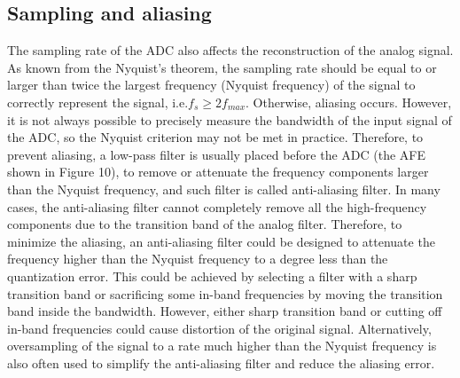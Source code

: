 \subsection{Sampling and aliasing}
The sampling rate of the ADC also affects the reconstruction of the analog signal. As known from the Nyquist’s theorem, the sampling rate should be equal to or larger than twice the largest frequency (Nyquist frequency) of the signal to correctly represent the signal, i.e.$ f_s \geqslant 2f_{max}$. Otherwise, aliasing occurs. However, it is not always possible to precisely measure the bandwidth of the input signal of the ADC, so the Nyquist criterion may not be met in practice. Therefore, to prevent aliasing, a low-pass filter is usually placed before the ADC (the AFE shown in Figure 10), to remove or attenuate the frequency components larger than the Nyquist frequency, and such filter is called anti-aliasing filter. In many cases, the anti-aliasing filter cannot completely remove all the high-frequency components due to the transition band of the analog filter. Therefore, to minimize the aliasing, an anti-aliasing filter could be designed to attenuate the frequency higher than the Nyquist frequency to a degree less than the quantization error\citep{mitra2006digital}. This could be achieved by selecting a filter with a sharp transition band or sacrificing some in-band frequencies by moving the transition band inside the bandwidth. However, either sharp transition band or cutting off in-band frequencies could cause distortion of the original signal. Alternatively, oversampling of the signal to a rate much higher than the Nyquist frequency is also often used to simplify the anti-aliasing filter and reduce the aliasing error.
